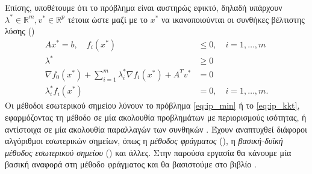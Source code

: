 Επίσης, υποθέτουμε ότι το πρόβλημα είναι αυστηρώς εφικτό, δηλαδή υπάρχουν
\( \lambda^* \in \mathbb{R}^m, v^* \in \mathbb{R}^p \) τέτοια ώστε μαζί με το
\(x^*\) να ικανοποιούνται οι συνθήκες βέλτιστης λύσης 
()
\begin{equation}\label{eq:ip_kkt}
    \begin{split}
        Ax^* = b, \quad f_i(x^*) &\leq 0,\quad i = 1, \dots, m\\
        \lambda^* &\geq 0\\
        \nabla f_0(x^*) + \sum_{i=1}^m \lambda_i^* \nabla f_i(x^*) + A^Tv^* & = 0 \\
        \lambda_i^*f_i(x^*) & = 0,\quad i = 1, \dots, m.
    \end{split}
\end{equation}
Οι μέθοδοι εσωτερικού σημείου λύνουν το πρόβλημα \eqref{eq:ip_min} ή το
\eqref{eq:ip_kkt}, εφαρμόζοντας τη μέθοδο  σε μία ακολουθία
προβλημάτων με περιορισμούς ισότητας, ή αντίστοιχα σε μία ακολουθία παραλλαγών
των συνθηκών . Έχουν αναπτυχθεί διάφοροι αλγόριθμοι εσωτερικών σημείων,
όπως η \emph{μέθοδος φράγματος} (), η \emph{βασική-δυϊκή μέθοδος
εσωτερικού σημείου} () και άλλες. Στην
παρούσα εργασία θα κάνουμε μία βασική αναφορά στη μέθοδο φράγματος και θα
βασιστούμε στο βιβλίο \cite{boyd2004convex}.

